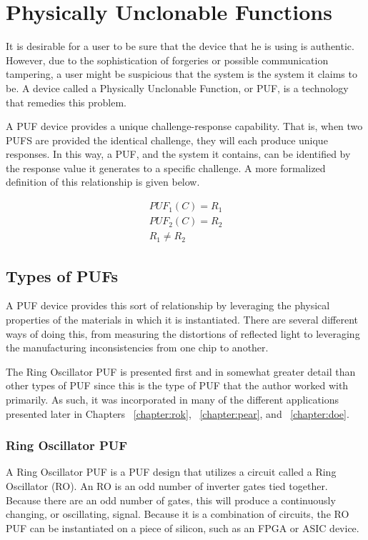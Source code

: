 
\chapter{Physically Unclonable Functions}
\label{chapter:pufoverview}
It is desirable for a user to be sure that the device that he is using is authentic. However, due to the sophistication
of forgeries or possible communication tampering, a user might be suspicious that the system is the system it claims
to be. A device called a Physically Unclonable Function, or PUF, is a technology that remedies this problem.

A PUF device provides a unique challenge-response capability. That is, when two PUFS are provided the identical
challenge, they will each produce unique responses. In this way, a PUF, and the system it contains, 
can be identified by the response value it generates to a specific challenge. A more formalized definition of
this relationship is given below.

\begin{align*}
PUF_1(C) = R_1\\
PUF_2(C) = R_2\\
R_1 \neq R_2
\end{align*}

\section{Types of PUFs}
A PUF device provides this sort of relationship by leveraging the physical properties
of the materials in which it is instantiated. There are several different ways of doing
this, from measuring the distortions of reflected light to leveraging the
manufacturing inconsistencies from one chip to another.

The Ring Oscillator PUF is presented first and in somewhat greater detail than
other types of PUF since this is the type of PUF that the author worked with primarily.
As such, it was incorporated in many of the different applications presented later in
Chapters ~\ref{chapter:rok}, ~\ref{chapter:pear}, and ~\ref{chapter:doe}.

\subsection{Ring Oscillator PUF}
A Ring Oscillator PUF is a PUF design that utilizes a circuit called a Ring 
Oscillator (RO). An RO is an odd number of inverter gates tied together. Because
there are an odd number of gates, this will produce a continuously changing,
or oscillating, signal. Because it is a combination of circuits, the RO PUF can
be instantiated on a piece of silicon, such as an FPGA or ASIC device.


